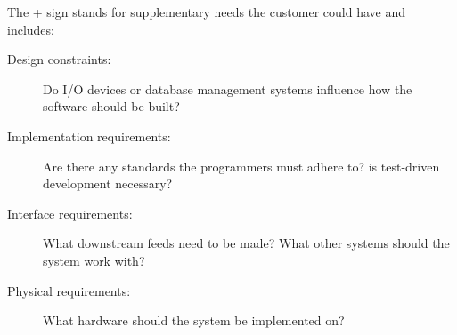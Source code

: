 The + sign stands for supplementary needs the customer could have and includes:

\begin{description}
    \item [Design constraints:] Do I/O devices or database management systems
    influence how the software should be built?

    \item [Implementation requirements:] Are there any standards the programmers
    must adhere to? is test-driven development necessary?

    \item [Interface requirements:] What downstream feeds need to be made? What
    other systems should the system work with?

    \item [Physical requirements:] What hardware should the system be
    implemented on?
\end{description}
